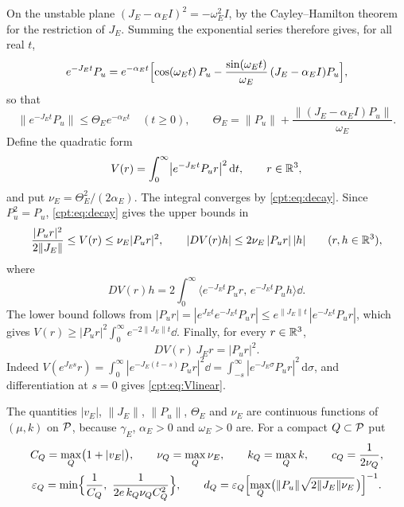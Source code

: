 On the unstable plane $(J_E-\alpha_EI)^2=-\omega_E^2I$, by the Cayley--Hamilton theorem for the restriction of $J_E$. Summing the exponential series therefore gives, for all real $t$,
\begin{equation}\label{cpt:eq:expformula}
e^{-J_Et}P_u=e^{-\alpha_Et}\Bigl[\cos(\omega_Et)\,P_u-\frac{\sin(\omega_Et)}{\omega_E}\,(J_E-\alpha_EI)P_u\Bigr],
\end{equation}
so that
\begin{equation}\label{cpt:eq:decay}
\|e^{-J_Et}P_u\|\le\Theta_Ee^{-\alpha_Et}\quad(t\ge0),\qquad
\Theta_E=\|P_u\|+\frac{\|(J_E-\alpha_EI)P_u\|}{\omega_E}.
\end{equation}
Define the quadratic form
\begin{equation}\label{cpt:eq:V}
V(r)=\int_0^\infty\bigl|e^{-J_Et}P_ur\bigr|^2\,\mathrm dt,\qquad r\in\mathbb R^3 ,
\end{equation}
and put $\nu_E=\Theta_E^2/(2\alpha_E)$. The integral converges by \eqref{cpt:eq:decay}. Since $P_u^2=P_u$, \eqref{cpt:eq:decay} gives the upper bounds in
\begin{equation}\label{cpt:eq:Vbounds}
\frac{|P_ur|^2}{2\|J_E\|}\le V(r)\le\nu_E|P_ur|^2,\qquad
|DV(r)h|\le2\nu_E\,|P_ur|\,|h|\qquad(r,h\in\mathbb R^3),
\end{equation}
where
\[
DV(r)h=2\int_0^\infty\bigl\langle e^{-J_Et}P_ur,\,e^{-J_Et}P_uh\bigr\rangle\dd .
\]
The lower bound follows from $|P_ur|=|e^{J_Et}e^{-J_Et}P_ur|\le e^{\|J_E\|t}\,|e^{-J_Et}P_ur|$, which gives $V(r)\ge|P_ur|^2\int_0^\infty e^{-2\|J_E\|t}\dd$. Finally, for every $r\in\mathbb R^3$,
\begin{equation}\label{cpt:eq:Vlinear}
DV(r)\,J_Er=|P_ur|^2 .
\end{equation}
Indeed $V(e^{J_Es}r)=\int_0^\infty|e^{-J_E(t-s)}P_ur|^2\dd=\int_{-s}^\infty|e^{-J_E\sigma}P_ur|^2\,\mathrm d\sigma$, and differentiation at $s=0$ gives \eqref{cpt:eq:Vlinear}.

The quantities $|v_E|$, $\|J_E\|$, $\|P_u\|$, $\Theta_E$ and $\nu_E$ are continuous functions of $(\mu,k)$ on $\mathcal P$, because $\gamma_E$, $\alpha_E>0$ and $\omega_E>0$ are. For a compact $Q\subset\mathcal P$ put
\begin{equation}\label{cpt:eq:constants}
\begin{gathered}
C_Q=\max_Q\bigl(1+|v_E|\bigr),\qquad
\nu_Q=\max_Q\nu_E,\qquad
k_Q=\max_Qk,\qquad
c_Q=\frac1{2\nu_Q},\\
\varepsilon_Q=\min\Bigl\{\frac1{C_Q},\ \frac1{2e\,k_Q\nu_QC_Q^2}\Bigr\},\qquad
d_Q=\varepsilon_Q\Bigl[\max_Q\bigl(\|P_u\|\sqrt{2\|J_E\|\nu_E}\,\bigr)\Bigr]^{-1}.
\end{gathered}
\end{equation}

